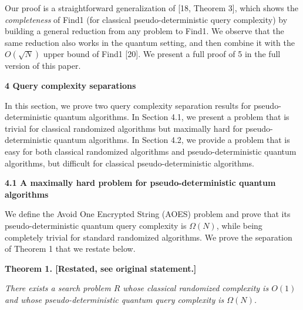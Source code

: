 \documentclass[10pt,a4paper]{article}
\begin{document}




Our proof is a straightforward generalization of [18, Theorem 3], which shows the \emph{completeness} of Find1 (for classical pseudo-deterministic query complexity) by building a general reduction from any problem to Find1. We observe that the same reduction also works in the quantum setting, and then combine it with the $O(\sqrt{N})$ upper bound of Find1 [20]. We present a full proof of 5 in the full version of this paper.\par






\par\medskip\noindent\textbf{
4 Query complexity separations}\par




In this section, we prove two query complexity separation results for pseudo-deterministic quantum algorithms.
In Section 4.1, we present a problem that is trivial for classical randomized algorithms but maximally hard for pseudo-deterministic quantum algorithms.
In Section 4.2, we provide a problem that is easy for both classical randomized algorithms and pseudo-deterministic quantum algorithms, but difficult for classical pseudo-deterministic algorithms.\par




\par\medskip\noindent\textbf{
4.1 A maximally hard problem for pseudo-deterministic quantum algorithms}\par




We define the Avoid One Encrypted String (AOES) problem and prove that its pseudo-deterministic quantum query complexity is $\Omega(N)$, while being completely trivial for standard randomized algorithms. We prove the separation of Theorem 1 that we restate below.\par






\par\medskip\noindent\textbf{
\textbf{Theorem 1}\textbf{.}
[Restated, see original statement.]}\par



\emph{There exists a search problem ${R}$ whose classical randomized complexity is $O(1)$ and whose pseudo-deterministic quantum query complexity is $\Omega(N)$.}\par
\end{document}
